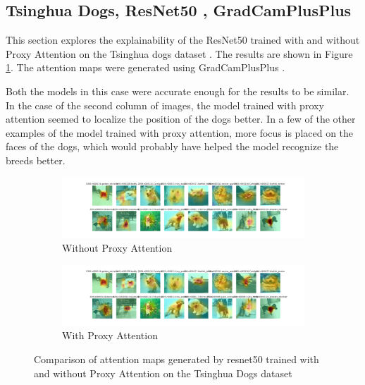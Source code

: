 \documentclass[a4paper,11pt,openright]{book}
\begin{document}
\subsection{Tsinghua Dogs, ResNet50 , GradCamPlusPlus}
This section explores the explainability of the ResNet50 \cite{heDeepResidualLearning2016} trained with and without Proxy Attention on the Tsinghua dogs dataset \cite{zouNewDatasetDog2020}. The results are shown in Figure \ref{fig:resnet50_tsing}. The attention maps were generated using GradCamPlusPlus \cite{chattopadhayGradCAMGeneralizedGradientBased2018}.

Both the models in this case were accurate enough for the results to be similar. In the case of the second column of images, the model trained with proxy attention seemed to localize the position of the dogs better.  In a few of the other examples of the model trained with proxy attention, more focus is placed on the faces of the dogs, which would probably have helped the model recognize the breeds better.

\begin{figure}[!htb]
    \begin{subfigure}[b]{1\textwidth}
        \includegraphics[width=\linewidth]{images/gpp_tsing_resnet50_noproxy_0.pdf}
        \caption{Without Proxy Attention}
    \end{subfigure}
    \begin{subfigure}[b]{1\textwidth}
        \includegraphics[width=\linewidth]{images/gpp_tsing_resnet50_proxy_0.pdf}
        \caption{With Proxy Attention}
    \end{subfigure}
    \caption{Comparison of attention maps generated by resnet50 trained with and without Proxy Attention on the Tsinghua Dogs dataset}
    \label{fig:resnet50_tsing}
\end{figure}
\end{document}
